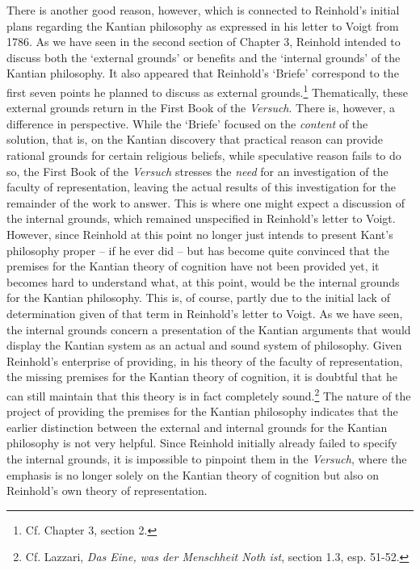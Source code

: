  There is another good reason, however, which is connected to Reinhold's initial plans regarding the Kantian philosophy as expressed in his letter to Voigt from 1786. As we have seen in the second section of Chapter 3, Reinhold intended to discuss both the `external grounds' or benefits and the `internal grounds' of the Kantian philosophy. It also appeared that Reinhold's `Briefe' correspond to the first seven points he planned to discuss as external grounds.\footnote{ Cf. Chapter 3, section 2. } Thematically, these external grounds return in the First Book of the \textit{Versuch}. There is, however, a difference in perspective. While the `Briefe' focused on the \textit{content }of the solution, that is, on the Kantian discovery that practical reason can provide rational grounds for certain religious beliefs, while speculative reason fails to do so, the First Book of the \textit{Versuch} stresses the \textit{need} for an investigation of the faculty of representation, leaving the actual results of this investigation for the remainder of the work to answer. This is where one might expect a discussion of the internal grounds, which remained unspecified in Reinhold's letter to Voigt. However, since Reinhold at this point no longer just intends to present Kant's philosophy proper {--} if he ever did {--} but has become quite convinced that the premises for the Kantian theory of cognition have not been provided yet, it becomes hard to understand what, at this point, would be the internal grounds for the Kantian philosophy. This is, of course, partly due to the initial lack of determination given of that term in Reinhold's letter to Voigt. As we have seen, the internal grounds concern a presentation of the Kantian arguments that would display the Kantian system as an actual and sound system of philosophy. Given Reinhold's enterprise of providing, in his theory of the faculty of representation, the missing premises for the Kantian theory of cognition, it is doubtful that he can still maintain that this theory is in fact completely sound.\footnote{ Cf. Lazzari, \textit{Das Eine, was der Menschheit Noth ist}, section 1.3, esp. 51{-}52. } The nature of the project of providing the premises for the Kantian philosophy indicates that the earlier distinction between the external and internal grounds for the Kantian philosophy is not very helpful. Since Reinhold initially already failed to specify the internal grounds, it is impossible to pinpoint them in the \textit{Versuch}, where the emphasis is no longer solely on the Kantian theory of cognition but also on Reinhold's own theory of representation. 

